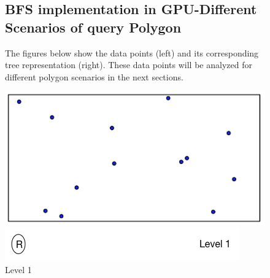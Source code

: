 \documentclass{article}
\begin{document}
\begin{figure}[ht]
 \subsection{BFS implementation in GPU-Different Scenarios of query Polygon}
 The figures below show the data points (left) and its corresponding tree representation (right). These data points will be analyzed for different polygon scenarios in the next sections.
 
  \caption{Level 1}
  \centering
  \begin{minipage}[b]{0.35\textwidth}
    \includegraphics[width=\textwidth]{Quadtree_basic_scenario1}
  \end{minipage}
  \hfill
  \begin{minipage}[b]{0.6\textwidth}
    \includegraphics[width=\textwidth]{1_1Quad_1_tree}
  \end{minipage}
\end{figure}
\end{document}
